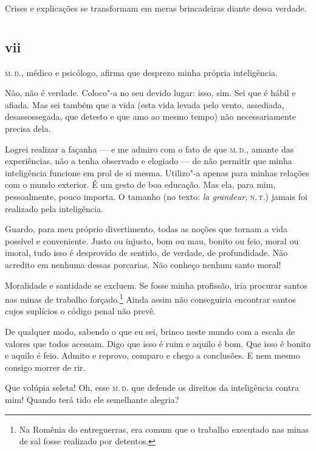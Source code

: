 Crises e explicações se transformam em meras brincadeiras diante dessa
verdade.

\chapter*{}
\section{vii}


\noindent{}\textsc{m.\,d.}, médico e psicólogo, afirma que desprezo minha própria
inteligência.

Não, não é verdade. Coloco"-a no seu devido lugar: isso, sim. Sei que é
hábil e afiada. Mas sei também que a vida (esta vida levada pelo vento,
assediada, desassossegada, que detesto e que amo ao mesmo
tempo) não necessariamente precisa dela.

Logrei realizar a façanha --- e me admiro com o fato de que \textsc{m.\,d.}, amante
das experiências, não a tenha observado e elogiado --- de não permitir que
minha inteligência funcione em prol de si mesma. Utilizo"-a apenas para
minhas relações com o mundo exterior. É um gesto de boa educação. Mas
ela, para mim, pessoalmente, pouco importa. O tamanho (no texto: \textit{la
grandeur}, \textsc{n.\,t.}) jamais foi realizado pela inteligência.

Guardo, para meu próprio divertimento, todas as noções que tornam a vida
possível e conveniente. Justo ou injusto, bom ou mau, bonito ou feio,
moral ou imoral, tudo isso é desprovido de sentido, de verdade, de
profundidade. Não acredito em nenhuma dessas porcarias. Não
conheço nenhum santo moral!

Moralidade e santidade se excluem. Se fosse minha profissão,
iria procurar santos nas minas de trabalho
forçado.\footnote{Na Romênia do entreguerras, era comum que o trabalho executado nas minas de sal fosse realizado por detentos.} Ainda
assim não conseguiria encontrar santos cujos suplícios o código
penal não prevê.

De qualquer modo, sabendo o que eu sei, brinco neste mundo com a escala
de valores que todos acessam. Digo que isso é ruim e aquilo é bom. Que
isso é bonito e aquilo é feio. Admito e reprovo, comparo e chego a
conclusões. E nem mesmo consigo morrer de rir.

Que volúpia seleta! Oh, esse \textsc{m.\,d.} que defende os direitos da
inteligência contra mim! Quando terá tido ele semelhante alegria?

